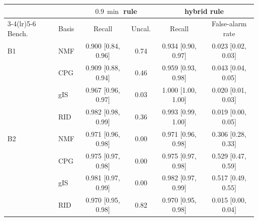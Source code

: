 \begin{tabular}{@{}llcccc@{}}
\toprule
 & & \multicolumn{2}{c}{$0.9\,\min$ rule} & \multicolumn{2}{c}{hybrid rule} \\
\cmidrule(lr){3-4}\cmidrule(lr){5-6}
Bench. & Basis & Recall & Uncal. & Recall & False-alarm rate \\
\midrule
B1 & NMF & 0.900 [0.84, 0.96] & 0.74 & 0.934 [0.90, 0.97] & 0.023 [0.02, 0.03] \\
 & CPG & 0.909 [0.88, 0.94] & 0.46 & 0.959 [0.93, 0.98] & 0.043 [0.04, 0.05] \\
 & gIS & 0.967 [0.96, 0.97] & 0.03 & 1.000 [1.00, 1.00] & 0.020 [0.01, 0.03] \\
 & RID & 0.982 [0.98, 0.99] & 0.36 & 0.993 [0.99, 1.00] & 0.019 [0.00, 0.05] \\
\midrule
B2 & NMF & 0.971 [0.96, 0.98] & 0.00 & 0.971 [0.96, 0.98] & 0.306 [0.28, 0.33] \\
 & CPG & 0.975 [0.97, 0.98] & 0.00 & 0.975 [0.97, 0.98] & 0.529 [0.47, 0.59] \\
 & gIS & 0.981 [0.97, 0.99] & 0.00 & 0.982 [0.97, 0.99] & 0.517 [0.49, 0.55] \\
 & RID & 0.970 [0.95, 0.98] & 0.82 & 0.970 [0.95, 0.98] & 0.015 [0.00, 0.04] \\
\bottomrule
\end{tabular}
